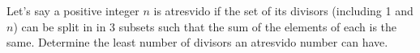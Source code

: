Let's say a positive integer $ n$ is atresvido if the set of its divisors (including 1 and $ n$) can be split in in 3 subsets such that the sum of the elements of each is the same. Determine the least number of divisors an atresvido number can have.
